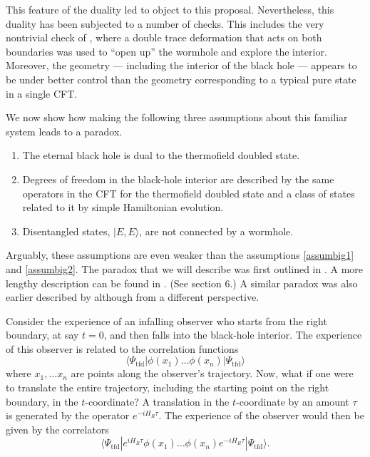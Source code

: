 \documentclass[12pt]{article}
\newcommand{\tfd}{\Psi_{\text{tfd}}} %
\begin{document}
This feature of the duality led \cite{Avery:2013bea,Mathur:2014dia} to object to this proposal.  Nevertheless, this  duality has been subjected to a number of checks. This includes the very nontrivial check of \cite{Gao:2016bin},  where a double trace deformation that acts on both boundaries was used to ``open up'' the wormhole and explore the interior. Moreover,  the geometry --- including the interior of the black hole --- appears to be under better control than the geometry corresponding to a typical pure state in a single CFT.


We now show how making the following three assumptions about this familiar system leads to a paradox.
\begin{enumerate}
\item\label{eternalassumbig1}
The eternal black hole is dual to the thermofield doubled state.
\item\label{eternalassumbig2}
Degrees of freedom in the black-hole interior are described by the same
operators in the CFT for the thermofield doubled state and a class of states related to it by simple Hamiltonian evolution.
\item\label{eternalassumbig3}
Disentangled states, $|E,E \rangle$, are not connected by a wormhole.
\end{enumerate}
Arguably, these assumptions are even weaker than the assumptions \ref{assumbig1} and \ref{assumbig2}. The paradox that we will describe was first outlined in \cite{Papadodimas:2015xma}. A more lengthy description can be found in \cite{Papadodimas:2015jra}. (See section 6.) A similar paradox was also earlier described by \cite{Marolf:2012xe} although from a different perspective.


Consider the experience of an infalling observer who starts from the right boundary, at say $t = 0$,  and then falls into the black-hole interior. The experience of this observer
is related to the correlation functions
\[
\langle \tfd | \phi(x_1) \ldots \phi(x_n) |\tfd \rangle
\]
where $x_1, \ldots x_n$ are points along the observer's trajectory. Now, what if one were to translate the entire trajectory, including the starting point on the right boundary, in the $t$-coordinate? A translation in the $t$-coordinate
by an amount $\tau$ is generated by the operator $e^{-i H_R \tau}$. The experience of the observer would then be given by the correlators
\[
\langle \tfd | e^{i H_R \tau} \phi(x_1) \ldots \phi(x_n) e^{-i H_R \tau} |\tfd \rangle.
\]
\end{document}
